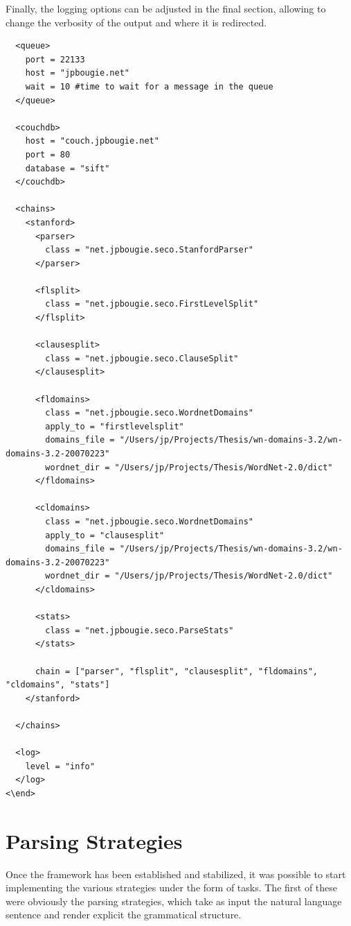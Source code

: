 Finally, the logging options can be adjusted in the final section, allowing to change the verbosity of the output and where it is redirected.

\begin{verbatim}
  <queue>
    port = 22133
    host = "jpbougie.net"
    wait = 10 #time to wait for a message in the queue
  </queue>

  <couchdb>
    host = "couch.jpbougie.net"
    port = 80
    database = "sift"
  </couchdb>

  <chains>
    <stanford>
      <parser>
        class = "net.jpbougie.seco.StanfordParser"
      </parser>

      <flsplit>
        class = "net.jpbougie.seco.FirstLevelSplit"
      </flsplit>

      <clausesplit>
        class = "net.jpbougie.seco.ClauseSplit"
      </clausesplit>

      <fldomains>
        class = "net.jpbougie.seco.WordnetDomains"
        apply_to = "firstlevelsplit"
        domains_file = "/Users/jp/Projects/Thesis/wn-domains-3.2/wn-domains-3.2-20070223"
        wordnet_dir = "/Users/jp/Projects/Thesis/WordNet-2.0/dict"
      </fldomains>

      <cldomains>
        class = "net.jpbougie.seco.WordnetDomains"
        apply_to = "clausesplit"
        domains_file = "/Users/jp/Projects/Thesis/wn-domains-3.2/wn-domains-3.2-20070223"
        wordnet_dir = "/Users/jp/Projects/Thesis/WordNet-2.0/dict"
      </cldomains>

      <stats>
        class = "net.jpbougie.seco.ParseStats"
      </stats>

      chain = ["parser", "flsplit", "clausesplit", "fldomains", "cldomains", "stats"]
    </stanford>

  </chains>

  <log>
    level = "info"
  </log>
<\end>

\end{verbatim}



\section{Parsing Strategies} %
\label{sec:parsing_strategies}

Once the framework has been established and stabilized, it was possible to start implementing the various strategies under the form of tasks. The first of these were obviously the parsing strategies, which take as input the natural language sentence and render explicit the grammatical structure.

